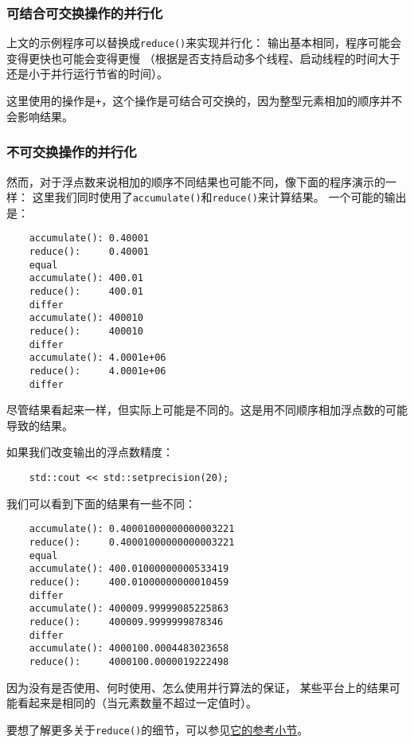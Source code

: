 \subsubsection{可结合可交换操作的并行化}\label{ch22.6.1.1}
上文的示例程序可以替换成\texttt{reduce()}来实现并行化：
输出基本相同，程序可能会变得更快也可能会变得更慢
（根据是否支持启动多个线程、启动线程的时间大于还是小于并行运行节省的时间）。

这里使用的操作是\texttt{+}，这个操作是可结合可交换的，因为整型元素相加的顺序并不会影响结果。

\subsubsection{不可交换操作的并行化}
然而，对于浮点数来说相加的顺序不同结果也可能不同，像下面的程序演示的一样：
这里我们同时使用了\texttt{accumulate()}和\texttt{reduce()}来计算结果。
一个可能的输出是：
\begin{lstlisting}
    accumulate(): 0.40001
    reduce():     0.40001
    equal
    accumulate(): 400.01
    reduce():     400.01
    differ
    accumulate(): 400010
    reduce():     400010
    differ
    accumulate(): 4.0001e+06
    reduce():     4.0001e+06
    differ
\end{lstlisting}
尽管结果看起来一样，但实际上可能是不同的。这是用不同顺序相加浮点数的可能导致的结果。

如果我们改变输出的浮点数精度：
\begin{lstlisting}
    std::cout << std::setprecision(20);
\end{lstlisting}
我们可以看到下面的结果有一些不同：
\begin{lstlisting}
    accumulate(): 0.40001000000000003221
    reduce():     0.40001000000000003221
    equal
    accumulate(): 400.01000000000533419
    reduce():     400.01000000000010459
    differ
    accumulate(): 400009.99999085225863
    reduce():     400009.9999999878346
    differ
    accumulate(): 4000100.0004483023658
    reduce():     4000100.0000019222498
\end{lstlisting}
因为没有是否使用、何时使用、怎么使用并行算法的保证，
某些平台上的结果可能看起来是相同的（当元素数量不超过一定值时）。

要想了解更多关于\texttt{reduce()}的细节，可以参见\hyperref[ch23.2.1]{它的参考小节}。

